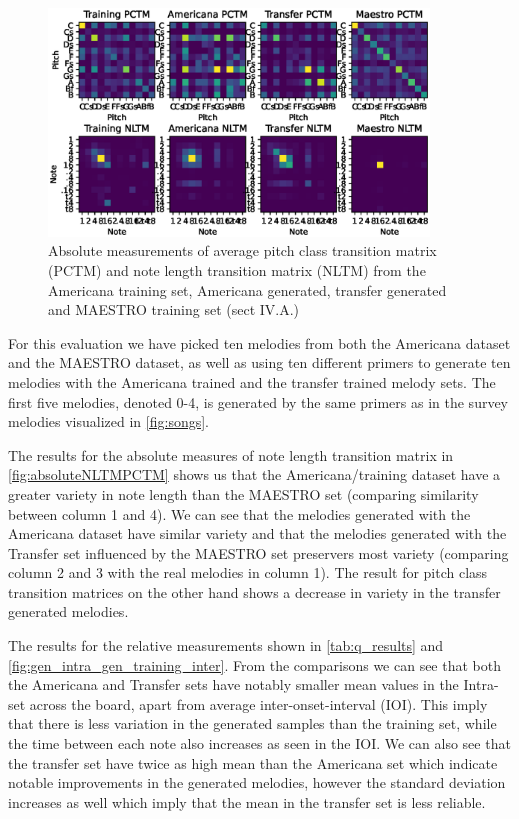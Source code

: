\documentclass{IEEEtran}
\begin{document}
\begin{figure}
    \centering
    \includegraphics[width=0.9\textwidth]{PCTMNLTM.eps}
    \caption{
        Absolute measurements of average pitch class transition matrix
        (PCTM) and note length transition matrix (NLTM) from the Americana
        training set, Americana generated, transfer generated and MAESTRO
        training set (sect IV.A.)
        \label{fig:absoluteNLTMPCTM}
    }
\end{figure}

For this evaluation we have picked ten melodies from both the Americana
dataset and the MAESTRO dataset, as well as using ten different primers to
generate ten melodies with the Americana trained and the transfer trained
melody sets. The first  five melodies, denoted 0-4, is generated by the
same primers as in the survey melodies visualized in \autoref{fig:songs}.

The results for the absolute measures of note length transition matrix
in \autoref{fig:absoluteNLTMPCTM} shows us that the Americana/training dataset have
a greater variety in note length than the MAESTRO set (comparing similarity 
between column 1 and 4). We can see that the
melodies generated with the Americana dataset have similar variety and that
the melodies generated with the Transfer set influenced by the MAESTRO set preservers
most variety (comparing column 2 and 3 with the real melodies in column 1). 
The result for pitch class transition matrices on the other
hand shows a decrease in variety in the transfer generated melodies.

The results for the relative measurements shown in \autoref{tab:q_results}
and \autoref{fig:gen_intra_gen_training_inter}. From the comparisons we
can see that both the Americana and Transfer sets have notably smaller mean
values in the Intra-set across the board, apart from average
inter-onset-interval (IOI). This imply that there is less variation in
the generated samples than the training set, while the time between each note
also increases as seen in the IOI. We can also see that the transfer set
have twice as high mean than the Americana set which indicate notable
improvements in the generated melodies, however the standard deviation
increases as well which imply that the mean in the transfer set is less
reliable.
\end{document}
